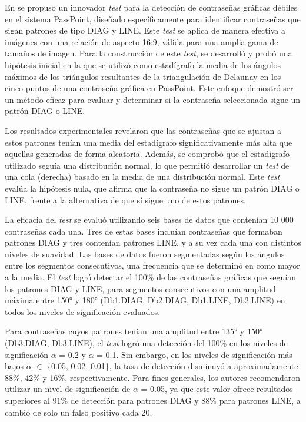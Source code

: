 \documentclass[12pt]{report}
\begin{document}

En \cite{13} se propuso un innovador \textit{test} para la detección de contraseñas gráficas débiles en el sistema PassPoint, diseñado específicamente para identificar contraseñas que sigan patrones de tipo DIAG y LINE. Este \textit{test} se aplica de manera efectiva a imágenes con una relación de aspecto 16:9, válida para una amplia gama de tamaños de imagen. Para la construcción de este \textit{test}, se desarrolló y probó una hipótesis inicial en la que se utilizó como estadígrafo la media de los ángulos máximos de los triángulos resultantes de la triangulación de Delaunay en los cinco puntos de una contraseña gráfica en PassPoint. Este enfoque demostró ser un método eficaz para evaluar y determinar si la contraseña seleccionada sigue un patrón DIAG o LINE.

Los resultados experimentales revelaron que las contraseñas que se ajustan a estos patrones tenían una media del estadígrafo significativamente más alta que aquellas generadas de forma aleatoria. Además, se comprobó que el estadígrafo utilizado seguía una distribución normal, lo que permitió desarrollar un \textit{test} de una cola (derecha) basado en la media de una distribución normal. Este \textit{test} evalúa la hipótesis nula, que afirma que la contraseña no sigue un patrón DIAG o LINE, frente a la alternativa de que sí sigue uno de estos patrones.

La eficacia del \textit{test} se evaluó utilizando seis bases de datos que contenían 10 000 contraseñas cada una. Tres de estas bases incluían contraseñas que formaban patrones DIAG y tres contenían patrones LINE, y a su vez cada una con distintos niveles de suavidad. Las bases de datos fueron segmentadas según los ángulos entre los segmentos consecutivos, una frecuencia que se determinó en \cite{5} como mayor a la media. El \textit{test} logró detectar el 100\% de las contraseñas gráficas que seguían los patrones DIAG y LINE, para segmentos consecutivos con una amplitud máxima entre 150° y 180° (Db1.DIAG, Db2.DIAG, Db1.LINE, Db2.LINE) en todos los niveles de significación evaluados.

Para contraseñas cuyos patrones tenían una amplitud entre 135° y 150° (Db3.DIAG, Db3.LINE), el \textit{test} logró una detección del 100\% en los niveles de significación $\alpha$ = 0.2 y $\alpha$ = 0.1. Sin embargo, en los niveles de significación más bajos  $\alpha$ $\in$ \{0.05, 0.02, 0.01\}, la tasa de detección disminuyó a aproximadamente 88\%, 42\% y 16\%, respectivamente. Para fines generales, los autores recomendaron  utilizar un nivel de significación de $\alpha$ = 0.05, ya que este valor ofrece resultados superiores al 91\% de detección para patrones DIAG y 88\% para patrones LINE, a cambio de solo un falso positivo cada 20.
\end{document}
